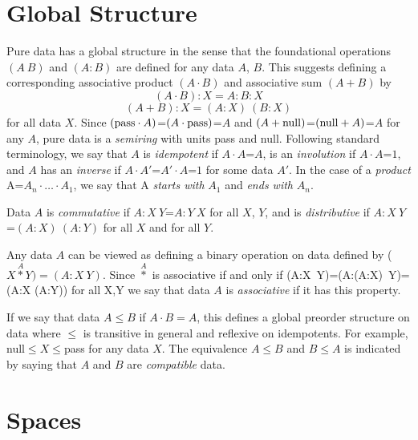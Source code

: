 \documentclass[11pt]{article}
\begin{document}
\section{Global Structure} 

    Pure data has a global structure in the sense that the foundational operations $(A\ B)$ and $(A:B)$ are defined for any data $A$, $B$.  
This suggests defining a corresponding associative product $(A\cdot B)$ and associative sum $(A+B)$ by    
\begin{equation}
(A \cdot B):X = A:B:X 
\end{equation}
\begin{equation}
(A+B):X = (A:X)\ (B:X) 
\end{equation}
for all data $X$.  Since $({\rm pass}\cdot A)$=$(A\cdot {\rm pass})$=$A$ and $(A+{\rm null})$=$({\rm null}+A)$=$A$ for any $A$, pure data is a {\it semiring} with units pass and null.  
Following standard terminology, we say that $A$ is {\it idempotent} if $A\cdot A$=$A$, is an {\it involution} if $A\cdot A$=$1$, and $A$ has an {\it inverse} if $A\cdot A'$=$A'\cdot A$=$1$ for some data $A'$.   
In the case of a {\it product}  A=$A_n\cdot\dots\cdot A_1$, we say that A {\it starts with} $A_1$ and {\it ends with} $A_n$.   

Data $A$ is {\it commutative} if $A:X\ Y$=$A:Y\ X$ for all $X$, $Y$, and is {\it distributive} if $A:X\ Y$=$(A:X)\ (A:Y)$ for all $X$ and for all $Y$.  

Any data $A$ can be viewed as defining a binary operation on data defined by ($X{\overset A\ast}Y)=(A:X\ Y)$.  Since ${\overset A\ast}$ is associative if and only if 
 (A:X\ Y)=(A:(A:X)\ Y)=(A:X (A:Y)) for all X,Y we say that data $A$ is {\it associative} if it has this property.  

     If we say that data $A\leq B$ if $A\cdot B=A$, this defines a global preorder structure on data where 
$\leq$ is transitive in general and reflexive on idempotents.  For example, null$\leq X\leq$pass for any data $X$.  
The equivalence $A\leq B$ and $B\leq A$ is indicated by saying that $A$ and $B$ are {\it compatible} data.
 
\section{Spaces}
\end{document}
